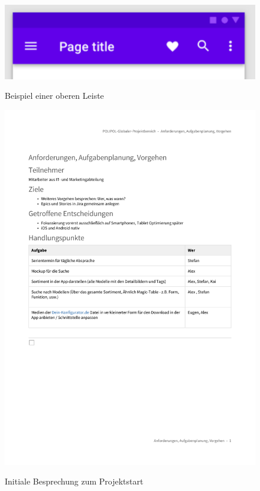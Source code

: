 \begin{figure}[hbt]
    \centering
    \begin{minipage}[t]{.98\textwidth}
        \caption[]{Beispiel einer oberen Leiste}
        \includegraphics[width=1\textwidth]{img/Material_Top_Bar.PNG}\\
        \label{fig:material_top_bar_example}
    \end{minipage}
\end{figure}

\begin{figure}[hbt]
    \centering
    \begin{minipage}[t]{.98\textwidth}
        \caption[]{Initiale Besprechung zum Projektstart}
        \includegraphics[width=1\textwidth]{img/Confluence_Anforderungsanalyse.pdf}\\
        \label{fig:initial_meeting}
    \end{minipage}
\end{figure}

